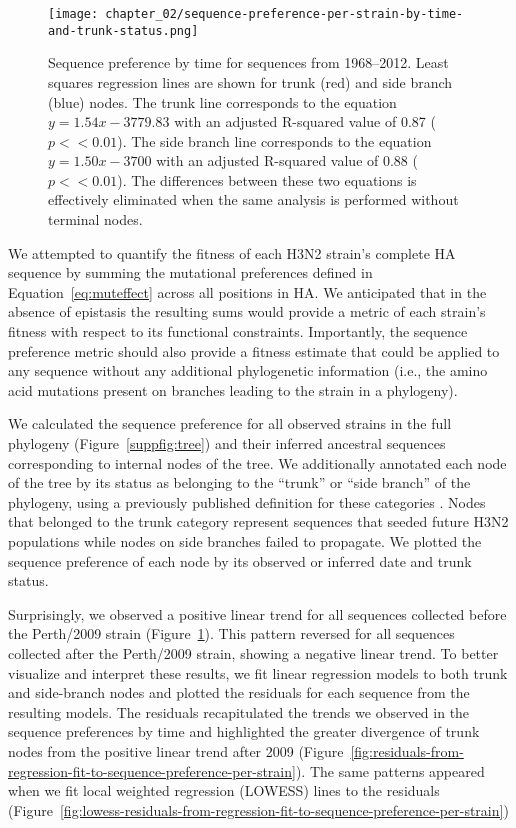 \begin{figure}
  \centering
  \texttt{[image: chapter\_02/sequence-preference-per-strain-by-time-and-trunk-status.png]}
  \caption{\label{fig:sequence-preference-per-strain} Sequence preference by time for sequences from 1968--2012.
    Least squares regression lines are shown for trunk (red) and side branch (blue) nodes.
    The trunk line corresponds to the equation $y = 1.54x - 3779.83$ with an adjusted R-squared value of 0.87 ($p << 0.01$).
    The side branch line corresponds to the equation $y = 1.50x - 3700$ with an adjusted R-squared value of 0.88 ($p << 0.01$).
    The differences between these two equations is effectively eliminated when the same analysis is performed without terminal nodes.}
\end{figure}

We attempted to quantify the fitness of each H3N2 strain's complete HA sequence by summing the mutational preferences defined in Equation~\ref{eq:muteffect} across all positions in HA.
We anticipated that in the absence of epistasis the resulting sums would provide a metric of each strain's fitness with respect to its functional constraints.
Importantly, the sequence preference metric should also provide a fitness estimate that could be applied to any sequence without any additional phylogenetic information (i.e., the amino acid mutations present on branches leading to the strain in a phylogeny).

We calculated the sequence preference for all observed strains in the full phylogeny (Figure~\ref{suppfig:tree}) and their inferred ancestral sequences corresponding to internal nodes of the tree.
We additionally annotated each node of the tree by its status as belonging to the ``trunk'' or ``side branch'' of the phylogeny, using a previously published definition for these categories \citep{Bedford2015fj}.
Nodes that belonged to the trunk category represent sequences that seeded future H3N2 populations while nodes on side branches failed to propagate.
We plotted the sequence preference of each node by its observed or inferred date and trunk status.

Surprisingly, we observed a positive linear trend for all sequences collected before the Perth/2009 strain (Figure~\ref{fig:sequence-preference-per-strain}).
This pattern reversed for all sequences collected after the Perth/2009 strain, showing a negative linear trend.
To better visualize and interpret these results, we fit linear regression models to both trunk and side-branch nodes and plotted the residuals for each sequence from the resulting models.
The residuals recapitulated the trends we observed in the sequence preferences by time and highlighted the greater divergence of trunk nodes from the positive linear trend after 2009 (Figure~\ref{fig:residuals-from-regression-fit-to-sequence-preference-per-strain}).
The same patterns appeared when we fit local weighted regression (LOWESS) lines to the residuals (Figure~\ref{fig:lowess-residuals-from-regression-fit-to-sequence-preference-per-strain})


